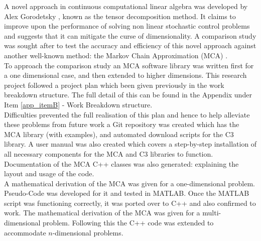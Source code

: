 \documentclass[11pt,draftd]{article}
\begin{document}
A novel approach in continuous computational linear algebra was developed by Alex Gorodetsky \cite{alex-c3}, known as the tensor decomposition method. It claims to improve upon the performance of solving non linear stochastic control problems and suggests that it can mitigate the curse of dimensionality. A comparison study was sought after to test the accuracy and efficiency of this novel approach against another well-known method: the Markov Chain Approximation (MCA) \cite{kushner}. \\

To approach the comparison study an MCA software library was written first for a one dimensional case, and then extended to higher dimensions. This research project followed a project plan which been given previously in the work breakdown structure. The full detail of this can be found in the Appendix under Item \ref{app_itemB} - Work Breakdown structure. \\

Difficulties prevented the full realisation of this plan and hence to help alleviate these problems from future work a Git repository was created which has the MCA library (with examples), and automated download scripts for the C3 library. A user manual was also created which covers a step-by-step installation of all necessary components for the MCA and C3 libraries to function. Documentation of the MCA C++ classes was also generated: explaining the layout and usage of the code. \\

A mathematical derivation of the MCA was given for a one-dimensional problem. Pseudo-Code was developed for it and tested in MATLAB. Once the MATLAB script was functioning correctly, it was ported over to C++ and also confirmed to work. The mathematical derivation of the MCA was given for a multi-dimensional problem. Following this the C++ code was extended to accommodate $ n $-dimensional problems. \\
\end{document}
